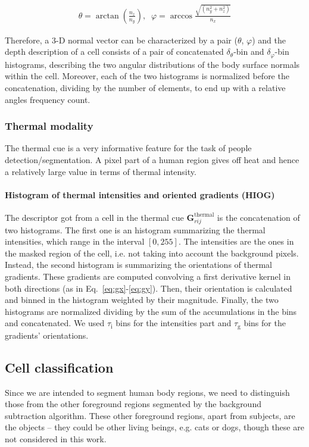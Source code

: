\documentclass[10pt,twocolumn,letterpaper]{article}
\begin{document}
\begin{gather}	
	\theta  = \arctan{\left( \frac{n_z}{n_y} \right)},\;\;
	\varphi = \arccos{\frac{ \sqrt{(n_y^2 + n_z^2)} }{n_x}}
\end{gather}

Therefore, a 3-D normal vector can be characterized by a pair ($\theta$, $\varphi$) and the depth description of a cell consists of a pair of concatenated $\delta_\theta$-bin and $\delta_\varphi$-bin histograms, describing the two angular distributions of the body surface normals within the cell. Moreover, each of the two histograms is normalized before the concatenation, dividing by the number of elements, to end up with a relative angles frequency count.

\subsubsection{Thermal modality}
\label{sssec:thermal}

The thermal cue is a very informative feature for the task of people detection/segmentation. A pixel part of a human region gives off heat and hence a relatively large value in terms of thermal intensity.

\paragraph{Histogram of thermal intensities and oriented gradients (HIOG)} 
The descriptor got from a cell in the thermal cue $\mathbf{G}_{rij}^{\mathrm{thermal}}$ is the concatenation of two histograms. The first one is an histogram summarizing the thermal intensities, which range in the interval $[0, 255]$. The intensities are the ones in the masked region of the cell, i.e. not taking into account the background pixels. Instead, the second histogram is summarizing the orientations of thermal gradients. These gradients are computed convolving a first derivative kernel in both directions (as in Eq.~\ref{eq:gx}-\ref{eq:gy}). Then, their orientation is calculated and binned in the histogram weighted by their magnitude. Finally, the two histograms are normalized dividing by the sum of the accumulations in the bins and concatenated. We used $\tau_{\mathrm{i}}$ bins for the intensities part and $\tau_{\mathrm{g}}$ bins for the gradients' orientations.

\subsection{Cell classification}
Since we are intended to segment human body regions, we need to distinguish those from the other foreground regions segmented by the background subtraction algorithm. These other foreground regions, apart from subjects, are the objects -- they could be other living beings, e.g. cats or dogs, though these are not considered in this work.
\end{document}
